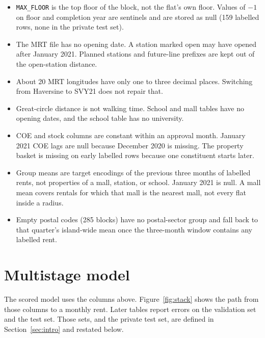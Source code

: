 \documentclass[11pt]{article}
\begin{document}
\begin{itemize}
\item \texttt{MAX\_FLOOR} is the top floor of the block, not the flat's own floor.
Values of $-1$ on floor and completion year are sentinels and are stored as null (159 labelled rows, none in the private test set).
\item The MRT file has no opening date.
A station marked open may have opened after January 2021.
Planned stations and future-line prefixes are kept out of the open-station distance.
\item About 20 MRT longitudes have only one to three decimal places.
Switching from Haversine to SVY21 does not repair that.
\item Great-circle distance is not walking time.
School and mall tables have no opening dates, and the school table has no university.
\item COE and stock columns are constant within an approval month.
January 2021 COE lags are null because December 2020 is missing.
The property basket is missing on early labelled rows because one constituent starts later.
\item Group means are target encodings of the previous three months of labelled rents, not properties of a mall, station, or school.
January 2021 is null.
A mall mean covers rentals for which that mall is the nearest mall, not every flat inside a radius.
\item Empty postal codes (285 blocks) have no postal-sector group and fall back to that quarter's island-wide mean once the three-month window contains any labelled rent.
\end{itemize}

\section{Multistage model}
\label{sec:stack}

The scored model uses the columns above.
Figure~\ref{fig:stack} shows the path from those columns to a monthly rent.
Later tables report errors on the validation set and the test set.
Those sets, and the private test set, are defined in Section~\ref{sec:intro} and restated below.
\end{document}
